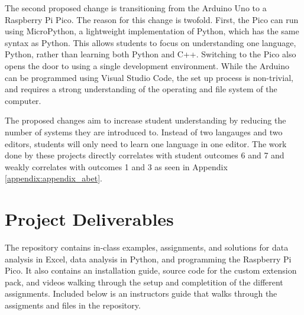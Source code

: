 The second proposed change is transitioning from the Arduino Uno
to a Raspberry Pi Pico. The reason for this change is twofold. First,
the Pico can run using MicroPython, a lightweight implementation of
Python, which has the same syntax as Python. This allows students
to focus on understanding one language, Python, rather than learning
both Python and C++. Switching to the Pico also opens the door to
using a single development environment. While the Arduino can
be programmed using Visual Studio Code, the set up process
is non-trivial, and requires a strong understanding of the
operating and file system of the computer. 

The proposed changes aim to increase student understanding
by reducing the number of systems they are introduced to. Instead
of two langauges and two editors, students will only need to
learn one language in one editor. The work done by these projects
directly correlates with student outcomes 6 and 7 and weakly
correlates with outcomes 1 and 3 as seen in Appendix 
\ref{appendix:appendix_abet}.

\section{Project Deliverables}
The repository contains in-class examples, assignments, and 
solutions for data analysis in Excel, data analysis in Python, 
and programming the Raspberry Pi Pico. It also contains an 
installation guide, source code for the custom extension pack, 
and videos walking through the setup and completition of the 
different assignments. Included below is an instructors guide
that walks through the assigments and files in the repository.

